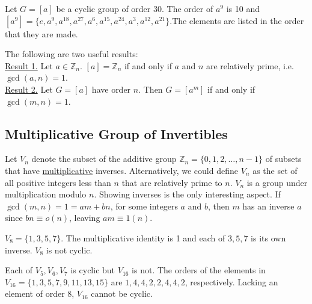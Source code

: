 \documentclass[12pt]{book}
\theoremstyle{definition}
\def\Z{\mathbb{Z}}
\begin{document}
\begin{tcexample}{}{}
Let $ G=[a] $ be a cyclic group of order 30. The order of $ a^9 $ is 10 and $ [a^9]=\{e,a^9,a^{18},a^{27},a^6,a^{15},a^{24},a^3,a^{12},a^{21}\}. $The elements are listed in the order that they are made.
\end{tcexample}

The following are two useful results:\\
\underline{Result 1.} Let $ a\in \Z_n. $ $ [a]=\Z_n $ if and only if $ a $ and $ n $ are relatively prime, i.e.\, $ \gcd(a,n)=1 $. \\[.2in]
\underline{Result 2.} Let $ G =[a]$ have order $ n $. Then $ G=[a^m] $ if and only if $ \gcd(m,n)=1 $.\\
\subsection{Multiplicative Group of Invertibles}
\quad Let $ V_n $ denote the subset of the additive group $ \Z_n=\{0,1,2,\dots,n-1\} $ of subsets that have \underline{multiplicative} inverses. Alternatively, we could define $ V_n $ as the set of all positive integers less than $ n $ that are relatively prime to $ n $. $ V_n $ is a group under multiplication modulo $ n $. Showing inverses is the only interesting aspect. If $ \gcd(m,n)=1=am+bn $, for some integers $ a $ and $ b $, then $ m $ has an inverse $ a $ since $ bn\equiv o(n) $, leaving $ am\equiv 1(n) $.\\

\begin{tcexample}{}{}
$ V_8 = \{1,3,5,7\}$. The multiplicative identity is 1 and each of $ 3,5,7 $ is its own inverse. $ V_8 $ is not cyclic.
\end{tcexample}

\begin{tcexample}{}{}
	  Each of $ V_5,V_6,V_7 $ is cyclic but $ V_{16} $ is not. The orders of the elements in $ V_{16}=\{1,3,5,7,9,11,13,15\} $ are $ 1,4,4,2,2,4,4,2 $, respectively. Lacking an element of order 8, $ V_{16} $ cannot be cyclic.
\end{tcexample}
~\\[.2in]
\end{document}
